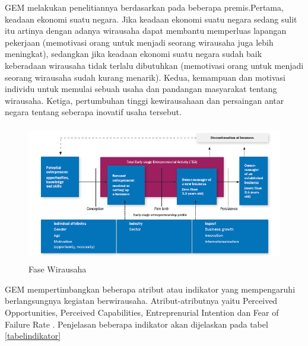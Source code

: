GEM melakukan penelitiannya berdasarkan pada beberapa premis.Pertama, keadaan ekonomi suatu negara. Jika keadaan ekonomi suatu negara sedang sulit itu artinya dengan adanya wirausaha dapat membantu memperluas lapangan pekerjaan (memotivasi orang untuk menjadi seorang wirausaha juga lebih meningkat), sedangkan jika keadaan ekonomi suatu negara sudah baik keberadaan wirausaha tidak terlalu dibutuhkan (memotivasi orang untuk menjadi seorang wirausaha sudah kurang menarik). Kedua, kemampuan dan motivasi individu untuk memulai sebuah usaha dan pandangan masyarakat tentang wirausaha. Ketiga, pertumbuhan tinggi kewirausahaan dan persaingan antar negara tentang seberapa inovatif usaha tersebut. \cite{GEM2013}
\begin{figure} [H]
	\centering  
	\includegraphics[width=14cm, height=6cm]{GEM2016-wirausaha}  
	\caption[Fase Wirausaha]{Fase Wirausaha} 
	\label{fig:fasewirausaha} 
\end{figure}


GEM mempertimbangkan beberapa atribut atau indikator yang mempengaruhi berlangsungnya kegiatan berwirausaha. Atribut-atributnya yaitu Perceived Opportunities, Perceived Capabilities, Entreprenurial Intention dan Fear of Failure Rate \cite{wirausahaGEM}. Penjelasan beberapa indikator akan dijelaskan pada tabel \ref{tabelindikator}

